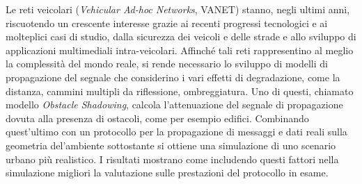 
Le reti veicolari (\textit{Vehicular Ad-hoc Networks}, VANET) stanno, negli ultimi anni, riscuotendo un crescente interesse
grazie ai recenti progressi tecnologici e ai molteplici casi di studio, dalla sicurezza dei veicoli e delle strade e allo sviluppo di applicazioni
multimediali intra-veicolari.
Affinché tali reti rappresentino al meglio la complessità del mondo reale, si rende necessario lo sviluppo di modelli di propagazione del segnale
che considerino i vari effetti di degradazione, come la distanza, cammini multipli da riflessione, ombreggiatura.
Uno di questi, chiamato modello \textit{Obstacle Shadowing}, calcola l'attenuazione del segnale di propagazione dovuta alla presenza di ostacoli, come per esempio edifici.
Combinando quest'ultimo con un protocollo per la propagazione di messaggi e dati reali sulla geometria del'ambiente sottostante si ottiene una simulazione di uno scenario urbano più realistico.
%
I risultati mostrano come includendo questi fattori nella simulazione migliori la valutazione sulle prestazioni del protocollo in esame. 
